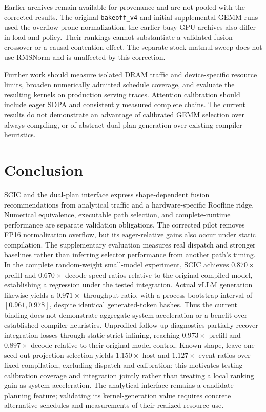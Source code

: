 \documentclass[a4paper,fleqn]{cas-dc}
\begin{document}
Earlier archives remain available for provenance and are not pooled with the corrected results.
The original \texttt{bakeoff\_v4} and initial supplemental GEMM runs used the overflow-prone normalization; the earlier busy-GPU archives also differ in load and policy.
Their rankings cannot substantiate a validated fusion crossover or a causal contention effect.
The separate stock-matmul sweep does not use RMSNorm and is unaffected by this correction.

Further work should measure isolated DRAM traffic and device-specific resource limits, broaden numerically admitted schedule coverage, and evaluate the resulting kernels on production serving traces.
Attention calibration should include eager SDPA and consistently measured complete chains.
The current results do not demonstrate an advantage of calibrated GEMM selection over always compiling, or of abstract dual-plan generation over existing compiler heuristics.

\section{Conclusion}
\label{sec:conclusion}

SCIC and the dual-plan interface express shape-dependent fusion recommendations from analytical traffic and a hardware-specific Roofline ridge.
Numerical equivalence, executable path selection, and complete-runtime performance are separate validation obligations.
The corrected pilot removes FP16 normalization overflow, but its eager-relative gains also occur under static compilation.
The supplementary evaluation measures real dispatch and stronger baselines rather than inferring selector performance from another path's timing.
In the complete random-weight small-model experiment, SCIC achieves $0.870\times$ prefill and $0.670\times$ decode speed ratios relative to the original compiled model, establishing a regression under the tested integration.
Actual vLLM generation likewise yields a $0.971\times$ throughput ratio, with a process-bootstrap interval of $[0.961,0.978]$, despite identical generated-token hashes.
Thus the current binding does not demonstrate aggregate system acceleration or a benefit over established compiler heuristics.
Unprofiled follow-up diagnostics partially recover integration losses through static strict inlining, reaching $0.973\times$ prefill and $0.897\times$ decode relative to their original-model control.
Known-shape, leave-one-seed-out projection selection yields $1.150\times$ host and $1.127\times$ event ratios over fixed compilation, excluding dispatch and calibration; this motivates testing calibration coverage and integration jointly rather than treating a local ranking gain as system acceleration.
The analytical interface remains a candidate planning feature; validating its kernel-generation value requires concrete alternative schedules and measurements of their realized resource use.
\end{document}
